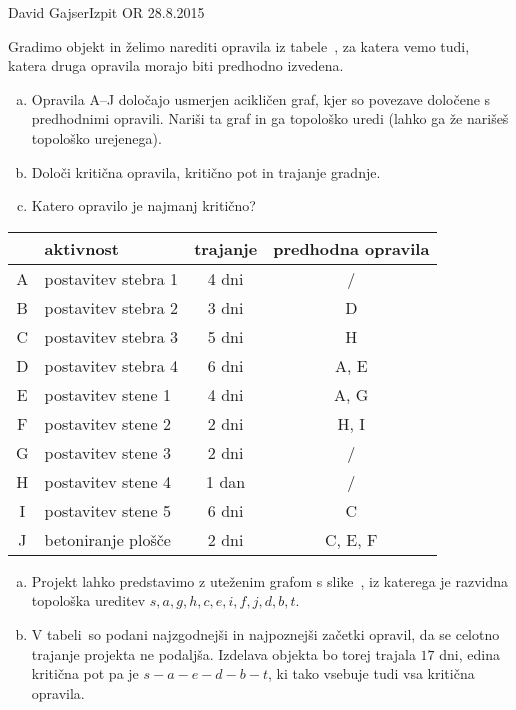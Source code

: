 \begin{naloga}{David Gajser}{Izpit OR 28.8.2015}
\begin{vprasanje}
Gradimo objekt in želimo narediti opravila iz tabele~\tab,
za katera vemo tudi, katera druga opravila morajo biti predhodno izvedena.
\begin{enumerate}[(a)]
\item Opravila A--J določajo usmerjen acikličen graf,
kjer so povezave določene s predhodnimi opravili.
Nariši ta graf in ga topološko uredi
(lahko ga že narišeš topološko urejenega).

\item Določi kritična opravila, kritično pot in trajanje gradnje.

\item Katero opravilo je najmanj kritično?
\end{enumerate}

\begin{tabela}
\begin{tabular}{c|l|c|c}
& aktivnost & trajanje & predhodna opravila \\
\hline
A & postavitev stebra 1 & 4 dni & / \\
B & postavitev stebra 2 & 3 dni & D \\
C & postavitev stebra 3 & 5 dni & H \\
D & postavitev stebra 4 & 6 dni & A, E \\
E & postavitev stene 1  & 4 dni & A, G \\
F & postavitev stene 2  & 2 dni & H, I \\
G & postavitev stene 3  & 2 dni & / \\
H & postavitev stene 4  & 1 dan & / \\
I & postavitev stene 5  & 6 dni & C \\
J & betoniranje plošče  & 2 dni & C, E, F \\
\end{tabular}
\end{tabela}
\end{vprasanje}

\begin{odgovor}
\begin{enumerate}[(a)]
\item Projekt lahko predstavimo z uteženim grafom s slike~\fig,
iz katerega je razvidna topološka ureditev
$s, a, g, h, c, e, i, f, j, d, b, t$.

\item V tabeli~ so podani
najzgodnejši in najpoznejši začetki opravil,
da se celotno trajanje projekta ne podaljša.
Izdelava objekta bo torej trajala $17$ dni,
edina kritična pot pa je $s - a - e - d - b - t$,
ki tako vsebuje tudi vsa kritična opravila.


\end{enumerate}
\end{odgovor}
\end{naloga}
